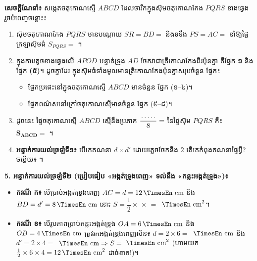 \documentclass[a4paper,10pt]{article}
\newcommand{\en}[1]{{\TimesEn #1}}
\newcommand{\unit}[1]{\,\text{\en{#1}}}
\newcommand{\blank}[1]{\makebox[#1]{\dotfill}}
\begin{document}
\begin{minipage}[c]{10.3cm}
  \textbf{សេចក្ដីណែនាំ៖} សង្កេតចតុកោណស្មើ $ABCD$ ដែលចារឹកក្នុងស៊ុមចតុកោណកែង $PQRS$ ខាងឆ្វេង រួចបំពេញចន្លោះ៖
  \begin{enumerate}[label=\textbf{\arabic*.}, leftmargin=1.4em, itemsep=2.5pt, topsep=2pt]
    \item ស៊ុមចតុកោណកែង $PQRS$ មានបណ្ដោយ $SR = BD =$ \blank{1.2cm} និងទទឹង $PS = AC =$ \blank{1.2cm} នាំឱ្យផ្ទៃក្រឡាស៊ុមធំ $S_{PQRS} =$ \blank{2.0cm}។
    \item ក្នុងការេតូចខាងឆ្វេងលើ $APOD$ បន្ទាត់ទ្រូង $AD$ ចែកវាជាត្រីកោណកែងពីរប៉ុនគ្នា គឺផ្នែក \textbf{១} និងផ្នែក \textbf{(៥)}។ ដូចគ្នាដែរ ក្នុងស៊ុមធំទាំងមូលមានត្រីកោណកែងប៉ុនគ្នាសរុបចំនួន \blank{1.2cm} ផ្នែក៖
    \begin{itemize}[leftmargin=1.2em, itemsep=1.5pt, topsep=1pt]
      \item ផ្នែកប្រផេះនៅក្នុងចតុកោណស្មើ $ABCD$ មានចំនួន \blank{1.2cm} ផ្នែក (១--៤)។
      \item ផ្នែកពណ៌សនៅក្រៅចតុកោណស្មើមានចំនួន \blank{1.2cm} ផ្នែក (៥--៨)។
    \end{itemize}
    \item ដូចនេះ ផ្ទៃចតុកោណស្មើ $ABCD$ ស្មើនឹងប្រភាគ $\dfrac{\blank{0.8cm}}{8} =$ \blank{1.0cm} នៃផ្ទៃស៊ុម $PQRS$ គឺ៖ $\mathbf{S_{ABCD} =}$ \blank{3.0cm}។
    \item \textbf{អន្ទាក់ការយល់ច្រឡំទី១៖} បើគេគណនា $d \times d'$ ដោយភ្លេចចែកនឹង $2$ តើគេកំពុងគណនាផ្ទៃអ្វី? ចម្លើយ៖ \blank{4.0cm}។
  \end{enumerate}
\end{minipage}

\vspace{3pt}
\begin{tcolorbox}[
  enhanced, sharp corners, colback=panelgray, colframe=black,
  boxrule=0.85pt, boxsep=2pt, top=3pt, bottom=3pt, left=6pt, right=6pt, after skip=3pt
]
  \textbf{5. អន្ទាក់ការយល់ច្រឡំទី២ (ប្រៀបធៀប «អង្កត់ទ្រូងពេញ» ទល់នឹង «កន្លះអង្កត់ទ្រូង»)៖}
  \begin{itemize}[leftmargin=1.3em, itemsep=2pt, topsep=1.5pt]
    \item \textbf{ករណី ក៖} បើប្រាប់អង្កត់ទ្រូងពេញ $AC = d = 12\unit{cm}$ និង $BD = d' = 8\unit{cm}$ នោះ $S = \dfrac{1}{2} \times$ \blank{1.2cm} $\times$ \blank{1.2cm} $=$ \blank{1.6cm} $\unit{cm}^2$។
    \item \textbf{ករណី ខ៖} បើរូបភាពប្រាប់កន្លះអង្កត់ទ្រូង $OA = 6\unit{cm}$ និង $OB = 4\unit{cm}$ ត្រូវរកអង្កត់ទ្រូងពេញសិន៖ $d = 2 \times 6 =$ \blank{1.2cm} $\unit{cm}$ និង $d' = 2 \times 4 =$ \blank{1.2cm} $\unit{cm} \Rightarrow S =$ \blank{1.6cm} $\unit{cm}^2$ (ហាមយក $\frac{1}{2}\times 6\times 4 = 12\unit{cm}^2$ ដាច់ខាត!)។
  \end{itemize}
\end{tcolorbox}
\end{document}
